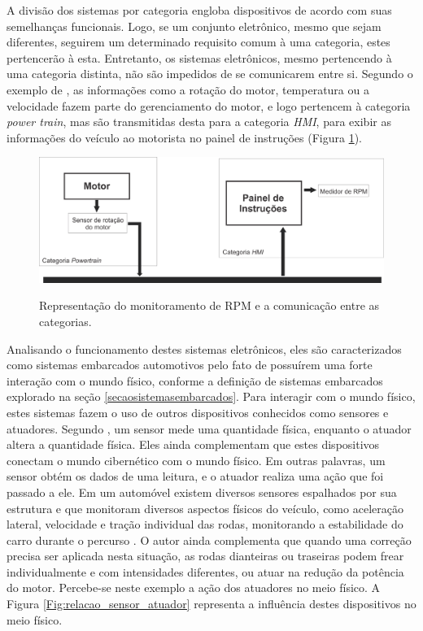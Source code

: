 A divisão dos sistemas por categoria engloba dispositivos de acordo com suas semelhanças funcionais. Logo, se um conjunto eletrônico, mesmo que sejam diferentes, seguirem um determinado requisito comum à uma categoria, estes pertencerão à esta. Entretanto, os sistemas eletrônicos, mesmo pertencendo à uma categoria distinta, não são impedidos de se comunicarem entre si. Segundo o exemplo de , as informações como a rotação do motor, temperatura ou a velocidade fazem parte do gerenciamento do motor, e logo pertencem à categoria \textit{power train}, mas são transmitidas desta para a categoria \textit{HMI}, para exibir as informações do veículo ao motorista no painel de instruções (Figura \ref{Fig:comunicacao_categorias_sistemas_embarcados}).

\begin{figure}[!ht]
\centering
\caption{Representação do monitoramento de RPM e a comunicação entre as categorias.} 
{\includegraphics[scale=.37]{imagens/intercomunicacaoEntreCategorias.png}}\\
 \label{Fig:comunicacao_categorias_sistemas_embarcados}
\end{figure}

Analisando o funcionamento destes sistemas eletrônicos, eles são caracterizados como sistemas embarcados automotivos pelo fato de possuírem uma forte interação com o mundo físico, conforme a definição de sistemas embarcados explorado na seção \ref{secaosistemasembarcados}. Para interagir com o mundo físico, estes sistemas fazem o uso de outros dispositivos conhecidos como sensores e atuadores. Segundo , um sensor mede uma quantidade física, enquanto o atuador altera a quantidade física. Eles ainda complementam que estes dispositivos conectam o mundo cibernético com o mundo físico. Em outras palavras, um sensor obtém os dados de uma leitura, e o atuador realiza uma ação que foi passado a ele. Em um automóvel existem diversos sensores espalhados por sua estrutura e que monitoram diversos aspectos físicos do veículo, como aceleração lateral, velocidade e tração individual das rodas, monitorando a estabilidade do carro durante o percurso \cite{navetsimonotlion}. O autor ainda complementa que quando uma correção precisa ser aplicada nesta situação, as rodas dianteiras ou traseiras podem frear individualmente e com intensidades diferentes, ou atuar na redução da potência do motor. Percebe-se neste exemplo a ação dos atuadores no meio físico. A Figura \ref{Fig:relacao_sensor_atuador} representa a influência destes dispositivos no meio físico.


